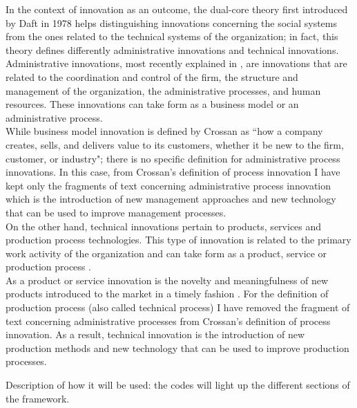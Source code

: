 In the context of innovation as an outcome, the dual-core theory first introduced by Daft in 1978 \citep{damanpour1998} helps distinguishing innovations concerning the social systems from the ones related to the technical systems of the organization; in fact, this theory defines differently administrative innovations and technical innovations. \\
Administrative innovations, most recently explained in \citep{crossan2010}, are innovations that are related to the coordination and control of the firm, the structure and management of the organization, the administrative processes, and human resources. These innovations can take form as a business model or an administrative process. \\
While business model innovation is defined by Crossan as ``how a company creates, sells, and delivers value to its customers, whether it be new to the firm, customer, or industry"; there is no specific definition for administrative process innovations.
In this case, from Crossan's definition of process innovation I have kept only the fragments of text concerning administrative process innovation which is the introduction of new management approaches and new technology that can be used to improve management processes. \\
On the other hand, technical innovations pertain to products, services and production process technologies. This type of innovation is related to the primary work activity of the organization and can take form as a product, service or production process \citep{damanpour2006}. \\
As a product or service innovation is the novelty and meaningfulness of new products introduced to the market in a timely fashion \citep{crossan2010}.
For the definition of production process (also called technical process) I have removed the fragment of text concerning administrative processes from Crossan's definition of process innovation. As a result, technical innovation is the introduction of new production methods and new technology that can be used to improve production processes.

Description of how it will be used: the codes will light up the different sections of the framework.


